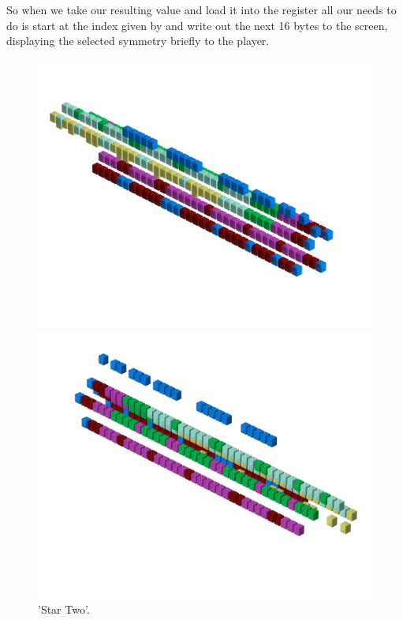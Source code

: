 So when we take our resulting value and load it into the  register all our  needs to do is start at the 
index given by  and write out the next 16 bytes to the screen, displaying the selected symmetry briefly to the player.
\clearpage
\begin{minipage}[b]{0.48\linewidth}
\begin{figure}[H]
    \centering
    \begin{adjustbox}{width=6cm,margin=0cm 0cm}
      \includegraphics[width=12cm]{src/patterns/pattern3-45.png}%
    \end{adjustbox}
    \begin{adjustbox}{width=6cm,margin=0cm -1.8cm}
      \includegraphics[width=12cm]{src/patterns/pattern3-225.png}%
    \end{adjustbox}
\caption{'Star Two'.}
\end{figure}
\end{minipage}
